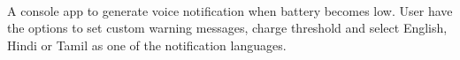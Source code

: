 \documentclass[]{deedy-resume-openfont}
\begin{document}
\begin{minipage}[t]{0.66\textwidth}
\\
A console app to generate voice notification when battery becomes low. User have the options to set custom warning messages, charge threshold and select English, Hindi or Tamil as one of the notification languages. \textbf{\href{https://github.com/tushar-rishav/balert}{}}
\sectionsep



\end{minipage} 
\end{document}
